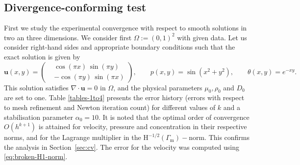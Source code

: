 \documentclass[onefignum,onetabnum,reqno,a4paper,final]{siamart250211}
\def\O{\Omega}
\newcommand\bu{\boldsymbol{u}}
\newcommand\0{\mathbf{0}}
\renewcommand\H{\mathrm{H}}
\renewcommand\O{\Omega}
\newcommand\Gm{\Gamma_{\mathrm{m}}}
\numberwithin{figure}{section}
\numberwithin{table}{section}
\begin{document}
	\subsection{Divergence-conforming test}
	\label{test-nonconforming}
	First we study the experimental convergence with respect to smooth solutions in two an three dimensions.   We consider first $\O:=(0,1)^2$ with given data. Let us consider right-hand sides and appropriate boundary conditions such that the exact solution is given by
	$$
	\bu(x,y)=\left(
	\begin{aligned}
		&\cos(\pi x)\,\sin(\pi y)\\
		&-\cos(\pi y)\,\sin(\pi x)
	\end{aligned}
	\right), \qquad p(x,y)=\sin(x^2+y^2), \qquad \theta(x,y)=e^{-xy}.
	$$
	This solution satisfies $\nabla\cdot\bu=0$ in $\Omega$, and  the physical parameters $\mu_0,\rho_0$ and $D_0$ are set to one.		Table \ref{tables-1to4} presents the error history (errors with respect to mesh refinement and Newton iteration count) for different values of $k$ and a stabilisation parameter $\alpha_0=10$. It is noted that the optimal order of convergence $O(h^{k+1})$ is attained for velocity, pressure and concentration in  their respective  norms, and for the Lagrange multiplier  in the $\H^{-1/2}(\Gm)-$norm. This confirms the analysis in Section~\ref{sec:cv}. The error for the velocity was computed using \eqref{eq:broken-H1-norm}. 
\end{document}
